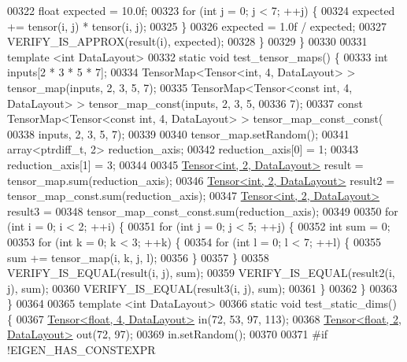 \begin{DoxyCode}
00322     \textcolor{keywordtype}{float} expected = 10.0f;
00323     \textcolor{keywordflow}{for} (\textcolor{keywordtype}{int} j = 0; j < 7; ++j) \{
00324       expected += tensor(i, j) * tensor(i, j);
00325     \}
00326     expected = 1.0f / expected;
00327     VERIFY\_IS\_APPROX(result(i), expected);
00328   \}
00329 \}
00330 
00331 \textcolor{keyword}{template} <\textcolor{keywordtype}{int} DataLayout>
00332 \textcolor{keyword}{static} \textcolor{keywordtype}{void} test\_tensor\_maps() \{
00333   \textcolor{keywordtype}{int} inputs[2 * 3 * 5 * 7];
00334   TensorMap<Tensor<int, 4, DataLayout> > tensor\_map(inputs, 2, 3, 5, 7);
00335   TensorMap<Tensor<const int, 4, DataLayout> > tensor\_map\_const(inputs, 2, 3, 5,
00336                                                                 7);
00337   \textcolor{keyword}{const} TensorMap<Tensor<const int, 4, DataLayout> > tensor\_map\_const\_const(
00338       inputs, 2, 3, 5, 7);
00339 
00340   tensor\_map.setRandom();
00341   array<ptrdiff\_t, 2> reduction\_axis;
00342   reduction\_axis[0] = 1;
00343   reduction\_axis[1] = 3;
00344 
00345   \hyperlink{class_eigen_1_1_tensor}{Tensor<int, 2, DataLayout>} result = tensor\_map.sum(reduction\_axis);
00346   \hyperlink{class_eigen_1_1_tensor}{Tensor<int, 2, DataLayout>} result2 = tensor\_map\_const.sum(reduction\_axis);
00347   \hyperlink{class_eigen_1_1_tensor}{Tensor<int, 2, DataLayout>} result3 =
00348       tensor\_map\_const\_const.sum(reduction\_axis);
00349 
00350   \textcolor{keywordflow}{for} (\textcolor{keywordtype}{int} i = 0; i < 2; ++i) \{
00351     \textcolor{keywordflow}{for} (\textcolor{keywordtype}{int} j = 0; j < 5; ++j) \{
00352       \textcolor{keywordtype}{int} sum = 0;
00353       \textcolor{keywordflow}{for} (\textcolor{keywordtype}{int} k = 0; k < 3; ++k) \{
00354         \textcolor{keywordflow}{for} (\textcolor{keywordtype}{int} l = 0; l < 7; ++l) \{
00355           sum += tensor\_map(i, k, j, l);
00356         \}
00357       \}
00358       VERIFY\_IS\_EQUAL(result(i, j), sum);
00359       VERIFY\_IS\_EQUAL(result2(i, j), sum);
00360       VERIFY\_IS\_EQUAL(result3(i, j), sum);
00361     \}
00362   \}
00363 \}
00364 
00365 \textcolor{keyword}{template} <\textcolor{keywordtype}{int} DataLayout>
00366 \textcolor{keyword}{static} \textcolor{keywordtype}{void} test\_static\_dims() \{
00367   \hyperlink{class_eigen_1_1_tensor}{Tensor<float, 4, DataLayout>} in(72, 53, 97, 113);
00368   \hyperlink{class_eigen_1_1_tensor}{Tensor<float, 2, DataLayout>} out(72, 97);
00369   in.setRandom();
00370 
00371 \textcolor{preprocessor}{#if !EIGEN\_HAS\_CONSTEXPR }

\end{DoxyCode}
